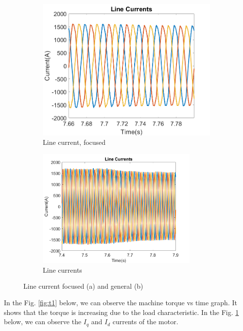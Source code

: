\begin{figure}[H]
        \centering
        \begin{subfigure}[b]{0.475\textwidth}
        \includegraphics[width = 7 cm]{figs/Partb-1-phasecurrents.png}
        \caption{Line current, focused}
        \label{fig:3phase1}
        \label{fig:id}
        \end{subfigure}
        \hfill
        \begin{subfigure}[b]{0.475\textwidth}  
            \centering
        \includegraphics [width= 8cm]{figs/linecurrent_partb.png} 
        \caption{Line currents} %
        \label{fig:3phase2}
        \end{subfigure}
        \caption{Line current focused (a) and general (b)}
        \label{fig:3phase_current}
        \end{figure}
        
In the Fig. \ref{fig:t1} below, we can observe the machine torque vs time graph. It shows that the torque is increasing due to the load characteristic. In the Fig. \ref{fig:id} below, we can observe the $I_q$ and $I_d$ currents of the motor.


